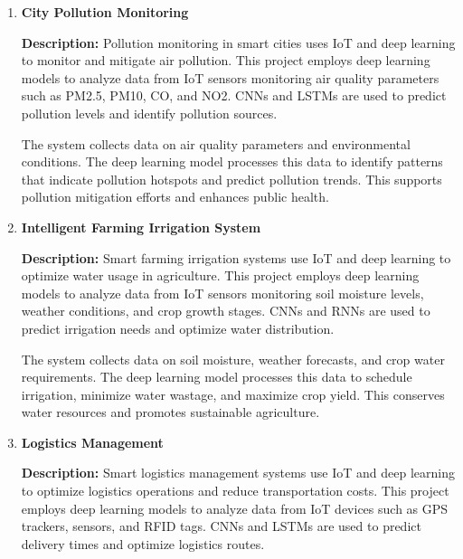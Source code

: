 \documentclass{article}
\begin{document}
\begin{enumerate}[label=\textbf{\arabic*.}, leftmargin=*]
\vspace{24pt} %
\item \textbf{City Pollution Monitoring}

\textbf{Description:}
Pollution monitoring in smart cities uses IoT and deep learning to monitor and mitigate air pollution. This project employs deep learning models to analyze data from IoT sensors monitoring air quality parameters such as PM2.5, PM10, CO, and NO2. CNNs and LSTMs are used to predict pollution levels and identify pollution sources.

The system collects data on air quality parameters and environmental conditions. The deep learning model processes this data to identify patterns that indicate pollution hotspots and predict pollution trends. This supports pollution mitigation efforts and enhances public health.



\vspace{24pt} %
\item \textbf{Intelligent Farming Irrigation System}

\textbf{Description:}
Smart farming irrigation systems use IoT and deep learning to optimize water usage in agriculture. This project employs deep learning models to analyze data from IoT sensors monitoring soil moisture levels, weather conditions, and crop growth stages. CNNs and RNNs are used to predict irrigation needs and optimize water distribution.

The system collects data on soil moisture, weather forecasts, and crop water requirements. The deep learning model processes this data to schedule irrigation, minimize water wastage, and maximize crop yield. This conserves water resources and promotes sustainable agriculture.


\vspace{24pt} %
\item \textbf{Logistics Management}

\textbf{Description:}
Smart logistics management systems use IoT and deep learning to optimize logistics operations and reduce transportation costs. This project employs deep learning models to analyze data from IoT devices such as GPS trackers, sensors, and RFID tags. CNNs and LSTMs are used to predict delivery times and optimize logistics routes.


\end{enumerate}
\end{document}
